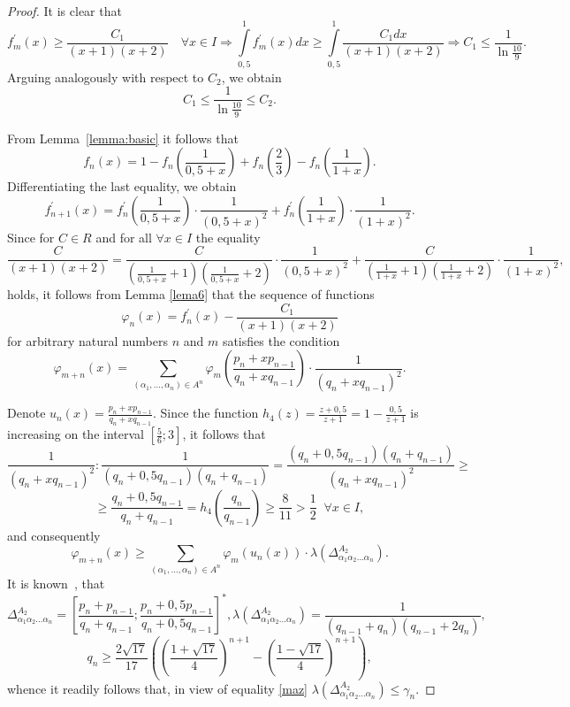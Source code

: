 \documentclass[11pt]{amsart}
\theoremstyle{plain}
\theoremstyle{remark}
\begin{document}
\begin{proof}
It is clear that
$$
f_{m}^\prime(x)\geq\frac{C_1}{(x+1)(x+2)} \quad \forall x\in I\Rightarrow \int\limits_{0,5}^{1}f_m^\prime(x)dx\geq\int\limits_{0,5}^{1}\frac{C_1dx}{(x+1)(x+2)}\Rightarrow C_1\leq\frac{1}{\ln\frac{10}{9}}.
$$
Arguing analogously with respect to $C_2$, we obtain
\begin{equation}\label{eqit}
C_1 \leq \frac{1}{\ln\frac{10}{9}} \leq C_2.
\end{equation}

From Lemma~\ref{lemma:basic} it follows that
    $$
    f_n(x)=1-f_n\left( \frac{1}{0,5+x}\right)+f_n\left(\frac{2}{3} \right)-f_n\left(\frac{1}{1+x} \right).
    $$
    Differentiating the last equality, we obtain
    $$
    f_{n+1}^\prime(x)=f_n^\prime\left( \frac{1}{0,5+x}\right)\cdot\frac{1}{(0,5+x)^2}+f_n^\prime\left( \frac{1}{1+x}\right)\cdot\frac{1}{(1+x)^2}.
    $$
    Since for $C \in R$ and for all $\forall x \in I$ the equality
 $$
    \frac{C}{(x+1)(x+2)}=\frac{C}{(\frac{1}{0,5+x}+1)
    (\frac{1}{0,5+x}+2)}\cdot\frac{1}{(0,5+x)^2}+\frac{C}
    {(\frac{1}{1+x}+1)(\frac{1}{1+x}+2)}
    \cdot\frac{1}{(1+x)^2},
$$
holds, it follows from Lemma \ref{lema6} that the sequence of functions
 $$\varphi_n(x)= f_n^\prime(x)-\frac{C_1}{(x+1)(x+2)}$$
  for arbitrary natural numbers $n$ and $m$ satisfies the condition
  $$
  \varphi_{m+n}(x)=\sum_{(\alpha_1,...,\alpha_n)\in A^n}\varphi_m\left(\frac{p_n+xp_{n-1}}{q_n+xq_{n-1}} \right)\cdot\frac{1}{(q_n+xq_{n-1})^2}.
  $$

 Denote $u_{n}(x)=\frac{p_n+xp_{n-1}}{q_n+xq_{n-1}}$.  Since the function $h_{4}(z)=\frac{z+0,5}{z+1}=1-\frac{0,5}{z+1}$
  is increasing on the interval $[\frac{5}{6};3]$, it follows that
 $$
   \frac{1}{(q_n+xq_{n-1})^2}:\frac{1}{(q_n+0,5q_{n-1})(q_n+q_{n-1})}=
   \frac{(q_n+0,5q_{n-1})(q_n+q_{n-1})}{(q_n+xq_{n-1})^2}\geq
  $$
  $$
  \geq\frac{q_n+0,5q_{n-1}}{q_n+q_{n-1}}=h_{4}\left(\frac{q_n}{q_{n-1}}\right)\geq\frac{8}{11}>\frac{1}{2} \;\; \forall x\in I,
  $$
   and consequently
  $$
\varphi_{m+n}(x)\geq  \sum_{(\alpha_1,...,\alpha_n)\in A^n}\varphi_m(u_n(x))\cdot\lambda(\Delta^{A_2}_{\alpha_1\alpha_2...\alpha_n}).
$$
It is known~\cite{prats}, that
$$\Delta^{A_2}_{\alpha_1\alpha_2...\alpha_n}=\left[\frac{p_{n}+p_{n-1}}{q_{n}+q_{n-1}};\frac{p_{n}+0,5p_{n-1}}{q_{n}+0,5q_{n-1}}\right]^{*},
     \lambda(\Delta^{A_2}_{{\alpha_1\alpha_2...\alpha_n}})=\frac{1}{(q_{n-1}+q_{n})(q_{n-1}+2q_{n})}, $$
$$q_{n}\geq \frac{2\sqrt{17}}{17}\left( \left(\frac{1+\sqrt{17}}{4}\right)^{n+1}-\left(\frac{1-\sqrt{17}}{4}\right)^{n+1}\right), $$
whence it readily follows that, in view of equality \eqref{maz} $\lambda(\Delta^{A_2}_{\alpha_1\alpha_2...\alpha_n}) \leq \gamma_{n}$.


\end{proof}
\end{document}
